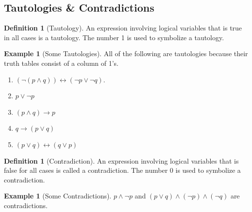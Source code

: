 \documentclass[10pt,]{book}
\theoremstyle{plain}
\theoremstyle{definition}
\newtheorem{definition}[theorem]{Definition}
\theoremstyle{definition}
\theoremstyle{definition}
\newtheorem{example}[theorem]{Example}
\theoremstyle{definition}
\begin{document}
\subsection[Tautologies & Contradictions]{Tautologies & Contradictions}\label{tautology-contradiction}
\begin{definition}[Tautology]\label{def-tautology}
\label{notation-6}
 An expression involving logical variables that is true in all cases is a tautology.  The number 1 is used to symbolize a tautology.%
\end{definition}
\begin{example}[Some Tautologies]\label{some-tautologies}
All of the following are tautologies because their truth tables consist of a column of 1's.%
\par
\leavevmode%
\begin{enumerate}[label=\alph*]
\item\hypertarget{li-78}{}\((\neg (p \land q))\leftrightarrow ( \neg  p \lor  \neg  q)\).%
\item\hypertarget{li-79}{}  \(p \lor \neg p\)%
\item\hypertarget{li-80}{}\((p \land q)\to  p\)%
\item\hypertarget{li-81}{}\(q\to (p\lor q)\)%
\item\hypertarget{li-82}{}\((p \lor  q)\leftrightarrow (q \lor p)\)%
\end{enumerate}
%
\end{example}
\begin{definition}[Contradiction]\label{def-contradiction}
\label{notation-7}
An expression involving logical variables that is false for all cases is called a contradiction. The number 0 is used to symbolize a contradiction.
%
\end{definition}
\begin{example}[Some Contradictions]\label{some-contradictions}
 \(p \land  \neg p\) and \((p\lor q)\land  (\neg p) \land  (\neg q)\) are contradictions.%
\end{example}
\typeout{************************************************}
\typeout{************************************************}
\end{document}
